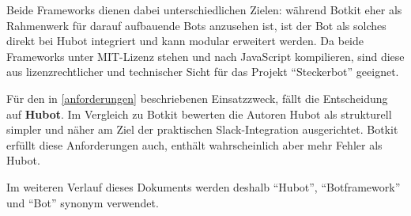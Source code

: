 Beide Frameworks dienen dabei unterschiedlichen Zielen: während Botkit eher als Rahmenwerk für darauf aufbauende Bots anzusehen ist, ist der Bot als solches direkt bei Hubot integriert und kann modular erweitert werden. Da beide Frameworks unter MIT-Lizenz stehen und nach JavaScript kompilieren, sind diese aus lizenzrechtlicher und technischer Sicht für das Projekt \enquote{Steckerbot} geeignet.

Für den in \autoref{anforderungen} beschriebenen Einsatzzweck, fällt die Entscheidung auf \textbf{Hubot}. Im Vergleich zu Botkit bewerten die Autoren Hubot als strukturell simpler und näher am Ziel der praktischen Slack-Integration ausgerichtet. Botkit erfüllt diese Anforderungen auch, enthält wahrscheinlich aber mehr Fehler als Hubot.

Im weiteren Verlauf dieses Dokuments werden deshalb \enquote{Hubot}, \enquote{Botframework} und \enquote{Bot} synonym verwendet.

